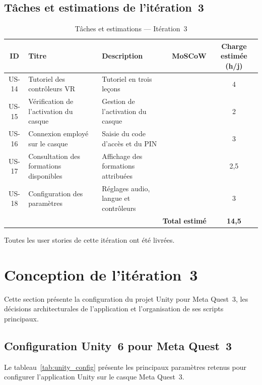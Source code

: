 \subsection{Tâches et estimations de l'itération~3}

\begin{table}[H]
  \centering
  \small
  \setlength{\tabcolsep}{5pt}
  \begin{tabularx}{\textwidth}{cp{3.5cm}Xc>{\footnotesize}c}
    \toprule
    \textbf{ID} & \textbf{Titre} & \textbf{Description} & \textbf{MoSCoW} & \textbf{Charge estimée (h/j)} \\
    \midrule
    US-14 & Tutoriel des contrôleurs VR &
      Tutoriel en trois leçons & \must{} & 4 \\
    US-15 & Vérification de l’activation du casque &
      Gestion de l'activation du casque & \must{} & 2 \\
    US-16 & Connexion employé sur le casque &
      Saisie du code d'accès et du PIN & \must{} & 3 \\
    US-17 & Consultation des formations disponibles &
      Affichage des formations attribuées & \must{} & 2,5 \\
    US-18 & Configuration des paramètres &
      Réglages audio, langue et contrôleurs & \should{} & 3 \\
    \midrule
    \multicolumn{4}{r}{\textbf{Total estimé}} & \textbf{14,5} \\
    \bottomrule
  \end{tabularx}
  \caption{Tâches et estimations --- Itération~3}
  \label{tab:backlog_s3}
\end{table}

\noindent Toutes les user stories de cette itération ont été livrées.

\section{Conception de l'itération~3}

Cette section présente la configuration du projet Unity pour Meta Quest~3, les décisions
architecturales de l'application et l'organisation de ses scripts principaux.

\subsection{Configuration Unity~6 pour Meta Quest~3}

Le tableau~\ref{tab:unity_config} présente les principaux paramètres retenus
pour configurer l'application Unity sur le casque Meta Quest~3.

